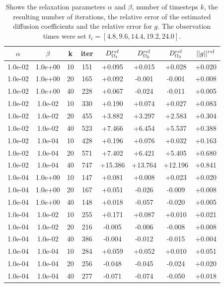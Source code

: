 \documentclass[12pt,a4paper]{article}
\begin{document}
\begin{table}
\centering
\caption{ Shows the relaxation parameters $\alpha$ and $\beta$, number of timesteps $k$, the resulting number of iterations, the relative error of the estimated diffusion coefficients and the relative error for $g$. The observation times were set $t_i = [ 4.8, 9.6, 14.4, 19.2, 24.0 ] $. }
\begin{tabular}{*{8}c}
$\alpha$ & $\beta$ & k & iter & $ D_{\Omega_1}\sp{rel}$& $D_{\Omega_2}\sp{rel} $ & $D_{\Omega_3}\sp{rel} $&$|| g ||\sp{rel} $ \\
\hline
 1.0e-02 	 & 1.0e+00 	 & 10 & 151 	 & +0.095 & +0.015 & +0.028 & +0.020 \\ 
 1.0e-02 	 & 1.0e+00 	 & 20 & 165 	 & +0.092 & -0.001 & -0.001 & +0.008 \\ 
 1.0e-02 	 & 1.0e+00 	 & 40 & 228 	 & +0.067 & -0.024 & -0.011 & +0.005 \\ 
 
 1.0e-02 	 & 1.0e-02 	 & 10 & 330 	 & +0.190 & +0.074 & +0.027 & +0.083 \\ 
 1.0e-02 	 & 1.0e-02 	 & 20 & 455 	 & +3.882 & +3.297 & +2.583 & +0.304 \\ 
  1.0e-02 	 & 1.0e-02 	 & 40 & 523 	 & +7.466 & +6.454 & +5.537 & +0.388 \\ 

 1.0e-02 	 & 1.0e-04 	 & 10 & 428 	 & +0.196 & +0.076 & +0.032 & +0.163 \\ 
 1.0e-02 	 & 1.0e-04 	 & 20 & 571 	 & +7.402 & +6.421 & +5.405 & +0.680 \\ 
 1.0e-02 	 & 1.0e-04 	 & 40 & 747 	 & +15.386 & +13.764 & +12.196 & +0.841 \\ 
  
  1.0e-04 	 & 1.0e+00 	 & 10 & 147 	 & +0.081 & +0.008 & +0.023 & +0.020 \\ 
  1.0e-04 	 & 1.0e+00 	 & 20 & 167 	 & +0.051 & -0.026 & -0.009 & +0.008 \\ 
  1.0e-04 	 & 1.0e+00 	 & 40 & 148 	 & +0.018 & -0.057 & -0.020 & +0.005 \\ 
  
 1.0e-04 	 & 1.0e-02 	 & 10 & 255 	 & +0.171 & +0.087 & +0.010 & +0.021 \\ 
 1.0e-04 	 & 1.0e-02 	 & 20 & 216 	 & -0.005 & -0.006 & -0.008 & +0.008 \\ 
 1.0e-04 	 & 1.0e-02 	 & 40 & 386 	 & -0.004 & -0.012 & -0.015 & +0.004 \\ 
  
  
 1.0e-04 	 & 1.0e-04 	 & 10 & 284 	 & +0.059 & +0.052 & +0.010 & +0.051 \\ 
 1.0e-04 	 & 1.0e-04 	 & 20 & 256 	 & -0.048 & -0.045 & -0.024 & +0.020 \\ 
  1.0e-04 	 & 1.0e-04 	 & 40 & 277 	 & -0.071 & -0.074 & -0.050 & +0.018 \\ 
  

\end{tabular}
\end{table}
\end{document}
